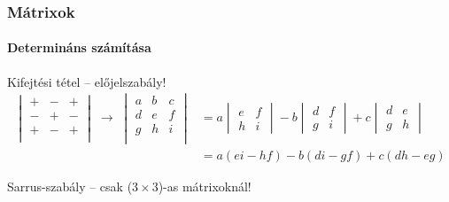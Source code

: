 \begin{frame}
  \frametitle{Mátrixok}
  \framesubtitle{Determináns számítása}

  \begin{block}{Kifejtési tétel -- előjelszabály!}
    \begin{align*}
      \begin{vmatrix}
        + & - & + \\
        - & + & - \\
        + & - & + \\
      \end{vmatrix}
      \; \rightarrow \;
      \begin{vmatrix}
        a & b & c \\
        d & e & f \\
        g & h & i \\
      \end{vmatrix}
       & = a \begin{vmatrix}
               e & f \\ h & i
             \end{vmatrix}
      - b \begin{vmatrix}
            d & f \\ g & i
          \end{vmatrix}
      + c \begin{vmatrix}
            d & e \\ g & h
          \end{vmatrix}
      \\
       & = a (ei - hf) - b(di - gf) + c(dh - eg)
    \end{align*}
  \end{block}

  \begin{block}{Sarrus-szabály -- csak ($3 \times 3$)-as mátrixoknál!}
    \centering
\end{block}
\end{frame}
